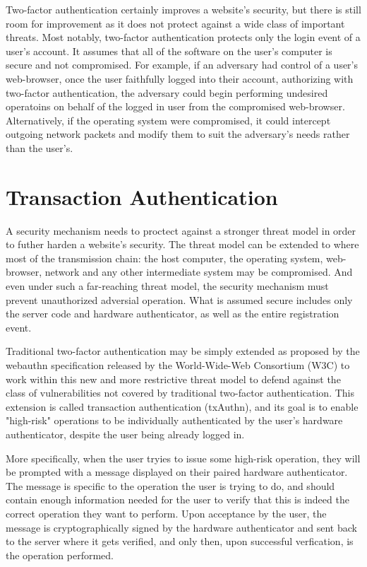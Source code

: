 Two-factor authentication certainly improves a website's security, but there is still room for improvement as it does not protect against a wide class of important threats. Most notably, two-factor authentication protects only the login event of a user's account. It assumes that all of the software on the user's computer is secure and not compromised. For example, if an adversary had control of a user's web-browser, once the user faithfully logged into their account, authorizing with two-factor authentication, the adversary could begin performing undesired operatoins on behalf of the logged in user from the compromised web-browser. Alternatively, if the operating system were compromised, it could intercept outgoing network packets and modify them to suit the adversary's needs rather than the user's. 

\section{Transaction Authentication}

A security mechanism needs to proctect against a stronger threat model in order to futher harden a website's security. The threat model can be extended to where most of the transmission chain: the host computer, the operating system, web-browser, network and any other intermediate system may be compromised. And even under such a far-reaching threat model, the security mechanism must prevent unauthorized adversial operation. What is assumed secure includes only the server code and hardware authenticator, as well as the entire registration event.

Traditional two-factor authentication may be simply extended as proposed by the webauthn specification \cite{TODO-webauthn} released by the World-Wide-Web Consortium (W3C) to work within this new and more restrictive threat model to defend against the class of vulnerabilities not covered by traditional two-factor authentication. This extension is called transaction authentication (txAuthn), and its goal is to enable "high-risk" operations to be individually authenticated by the user's hardware authenticator, despite the user being already logged in.

More specifically, when the user tryies to issue some high-risk operation, they will be prompted with a message displayed on their paired hardware authenticator. The message is specific to the operation the user is trying to do, and should contain enough information needed for the user to verify that this is indeed the correct operation they want to perform. Upon acceptance by the user, the message is cryptographically signed by the hardware authenticator and sent back to the server where it gets verified, and only then, upon successful verfication, is the operation performed.

